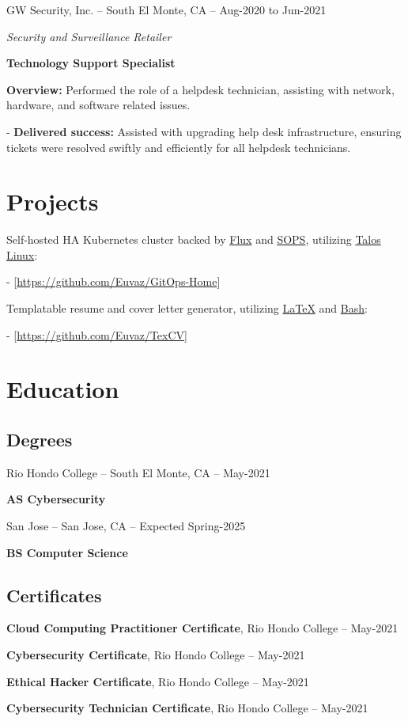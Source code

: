 \documentclass[a4paper]{article}
\begin{document}
\vspace{20pt}
\begin{minipage}{\textwidth}
GW Security, Inc. -- South El Monte, CA -- Aug-2020 to Jun-2021\par
\textit{Security and Surveillance Retailer}\par
\textbf{Technology Support Specialist}

\medskip
\textbf{Overview:} Performed the role of a helpdesk technician, assisting with network, hardware, and software related issues.

\medskip
- \textbf{Delivered success:} Assisted with upgrading help desk infrastructure, ensuring tickets were resolved swiftly and efficiently for all helpdesk technicians.
\end{minipage}

\section{Projects}
Self-hosted HA Kubernetes cluster backed by \href{https://toolkit.fluxcd.io}{Flux} and \href{https://toolkit.fluxcd.io/guides/mozilla-sops}{SOPS}, utilizing \href{https://www.talos.dev/}{Talos Linux}:\par
- [\url{https://github.com/Euvaz/GitOps-Home}]

\medskip
Templatable resume and cover letter generator, utilizing \href{https://www.latex-project.org/}{LaTeX} and \href{https://www.gnu.org/software/bash/}{Bash}:\par
- [\url{https://github.com/Euvaz/TexCV}]

\section{Education}
\begin{minipage}{\textwidth}
\subsection{Degrees}
Rio Hondo College -- South El Monte, CA -- May-2021\par
\textbf{AS Cybersecurity}\par

\medskip
San Jose -- San Jose, CA -- Expected Spring-2025\par
\textbf{BS Computer Science}

\vspace{20pt}
\subsection{Certificates}
\textbf{Cloud Computing Practitioner Certificate}, Rio Hondo College -- May-2021\par
\textbf{Cybersecurity Certificate}, Rio Hondo College -- May-2021\par
\textbf{Ethical Hacker Certificate}, Rio Hondo College -- May-2021\par
\textbf{Cybersecurity Technician Certificate}, Rio Hondo College -- May-2021
\end{minipage}
\end{document}
